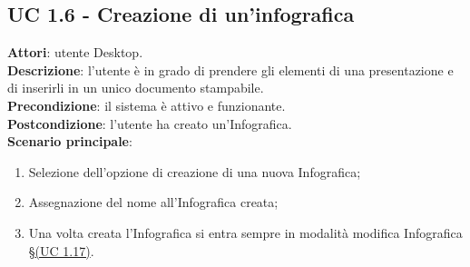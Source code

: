 \subsection{UC 1.6 - Creazione di un'infografica}{
	\label{uc1.6}
	\textbf{Attori}: utente Desktop. \\
	\textbf{Descrizione}: l'utente è in grado di prendere gli elementi di una presentazione e di inserirli in un unico documento stampabile. \\
	\textbf{Precondizione}: il sistema è attivo e funzionante.	\\
	\textbf{Postcondizione}: l'utente ha creato un'Infografica.	\\
	\textbf{Scenario principale}:
	\begin{enumerate}
		\item Selezione dell'opzione di creazione di una nuova Infografica;
		\item Assegnazione del nome all'Infografica creata;
		\item Una volta creata l'Infografica si entra sempre in modalità modifica Infografica \S\hyperref[uc1.17]{(UC 1.17)}.
	\end{enumerate}
	}
